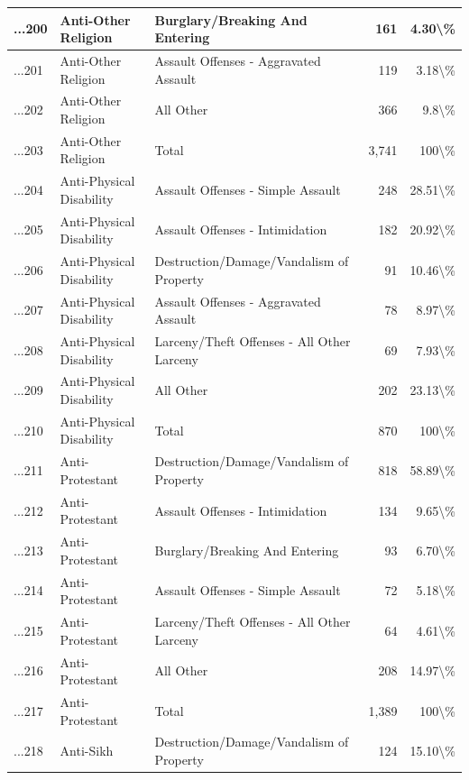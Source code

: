 \documentclass[
]{krantz}
\begin{document}
\begin{longtable}[t]{l|l|l|r|r}
\hline
...200 & Anti-Other Religion & Burglary/Breaking And Entering & 161 & 4.30\textbackslash{}\%\\
\hline
...201 & Anti-Other Religion & Assault Offenses - Aggravated Assault & 119 & 3.18\textbackslash{}\%\\
\hline
...202 & Anti-Other Religion & All Other & 366 & 9.8\textbackslash{}\%\\
\hline
...203 & Anti-Other Religion & Total & 3,741 & 100\textbackslash{}\%\\
\hline
...204 & Anti-Physical Disability & Assault Offenses - Simple Assault & 248 & 28.51\textbackslash{}\%\\
\hline
...205 & Anti-Physical Disability & Assault Offenses - Intimidation & 182 & 20.92\textbackslash{}\%\\
\hline
...206 & Anti-Physical Disability & Destruction/Damage/Vandalism of Property & 91 & 10.46\textbackslash{}\%\\
\hline
...207 & Anti-Physical Disability & Assault Offenses - Aggravated Assault & 78 & 8.97\textbackslash{}\%\\
\hline
...208 & Anti-Physical Disability & Larceny/Theft Offenses - All Other Larceny & 69 & 7.93\textbackslash{}\%\\
\hline
...209 & Anti-Physical Disability & All Other & 202 & 23.13\textbackslash{}\%\\
\hline
...210 & Anti-Physical Disability & Total & 870 & 100\textbackslash{}\%\\
\hline
...211 & Anti-Protestant & Destruction/Damage/Vandalism of Property & 818 & 58.89\textbackslash{}\%\\
\hline
...212 & Anti-Protestant & Assault Offenses - Intimidation & 134 & 9.65\textbackslash{}\%\\
\hline
...213 & Anti-Protestant & Burglary/Breaking And Entering & 93 & 6.70\textbackslash{}\%\\
\hline
...214 & Anti-Protestant & Assault Offenses - Simple Assault & 72 & 5.18\textbackslash{}\%\\
\hline
...215 & Anti-Protestant & Larceny/Theft Offenses - All Other Larceny & 64 & 4.61\textbackslash{}\%\\
\hline
...216 & Anti-Protestant & All Other & 208 & 14.97\textbackslash{}\%\\
\hline
...217 & Anti-Protestant & Total & 1,389 & 100\textbackslash{}\%\\
\hline
...218 & Anti-Sikh & Destruction/Damage/Vandalism of Property & 124 & 15.10\textbackslash{}\%\\

\end{longtable}
\end{document}
